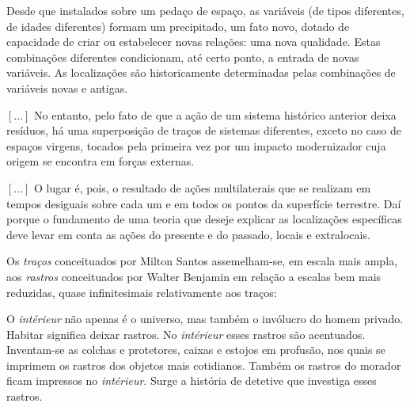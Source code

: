 \begin{citacao}
Desde que instalados sobre um pedaço de espaço, as variáveis (de tipos diferentes, de idades diferentes) formam um precipitado, um fato novo, dotado de capacidade de criar ou estabelecer novas relações: uma nova qualidade. Estas combinações diferentes condicionam, até certo ponto, a entrada de novas variáveis. As localizações são historicamente determinadas pelas combinações de variáveis novas e antigas. 

\([\dots]\) No entanto, pelo fato de que a ação de um sistema histórico anterior deixa resíduos, há uma superposição de traços de sistemas diferentes, exceto no caso de espaços virgens, tocados pela primeira vez por um impacto modernizador cuja origem se encontra em forças externas. 

\([\dots]\) O lugar é, pois, o resultado de ações multilaterais que se realizam em tempos desiguais sobre cada um e em todos os pontos da superfície terrestre. Daí porque o fundamento de uma teoria que deseje explicar as localizações específicas deve levar em conta as ações do presente e do passado, locais e extralocais. \cite[p.~256-258]{SANTOS2008}
\end{citacao}

Os \textit{traços} conceituados por Milton Santos assemelham-se, em escala mais ampla, aos \textit{rastros} conceituados por Walter Benjamin em relação a escalas bem mais reduzidas, quase infinitesimais relativamente aos traços:

\begin{citacao}
O \textit{intérieur} não apenas é o universo, mas também o invólucro do homem privado. Habitar significa deixar rastros. No \textit{intérieur} esses rastros são acentuados. Inventam-se as colchas e protetores, caixas e estojos em profusão, nos quais se imprimem os rastros dos objetos mais cotidianos. Também os rastros do morador ficam impressos no \textit{intérieur}. Surge a história de detetive que investiga esses rastros. \cite[p.~46]{benjamin_passagens_2006}
\end{citacao}

